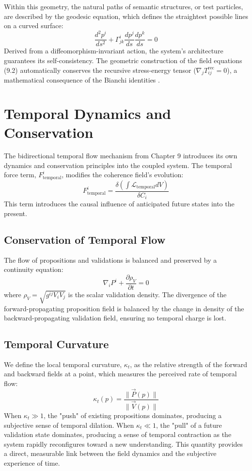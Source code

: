 Within this geometry, the natural paths of semantic structures, or test particles, are described by the geodesic equation, which defines the straightest possible lines on a curved surface:
\begin{equation}
\frac{d^2 p^i}{ds^2} + \Gamma^i_{jk} \frac{dp^j}{ds} \frac{dp^k}{ds} = 0
\end{equation}
Derived from a diffeomorphism-invariant action, the system's architecture guarantees its self-consistency. The geometric construction of the field equations (9.2) automatically conserves the recursive stress-energy tensor ($\nabla_j T^{\text{rec}}_{ij} = 0$), a mathematical consequence of the Bianchi identities \autocite{Bianchi1902}.

\section{Temporal Dynamics and Conservation}

The bidirectional temporal flow mechanism from Chapter 9 introduces its own dynamics and conservation principles into the coupled system. The temporal force term, \(F^i_{\text{temporal}}\), modifies the coherence field's evolution:
\begin{equation}
F^i_{\text{temporal}} = \frac{\delta(\int \mathcal{L}_{\text{temporal}} dV)}{\delta C_i}
\end{equation}
This term introduces the causal influence of anticipated future states into the present.

\subsection{Conservation of Temporal Flow}
The flow of propositions and validations is balanced and preserved by a continuity equation:
\begin{equation}
\nabla_i P^i + \frac{\partial \rho_V}{\partial t} = 0
\end{equation}
where \(\rho_V = \sqrt{g^{ij} V_{i} V_{j}}\) is the scalar validation density. The divergence of the forward-propagating proposition field is balanced by the change in density of the backward-propagating validation field, ensuring no temporal charge is lost.

\subsection{Temporal Curvature}
We define the local temporal curvature, \(\kappa_t\), as the relative strength of the forward and backward fields at a point, which measures the perceived rate of temporal flow:
\begin{equation}
\kappa_t(p) = \frac{\|\vec{P}(p)\|}{\|\vec{V}(p)\|}
\end{equation}
When \(\kappa_t \gg 1\), the "push" of existing propositions dominates, producing a subjective sense of temporal dilation. When \(\kappa_t \ll 1\), the "pull" of a future validation state dominates, producing a sense of temporal contraction as the system rapidly reconfigures toward a new understanding. This quantity provides a direct, measurable link between the field dynamics and the subjective experience of time. 